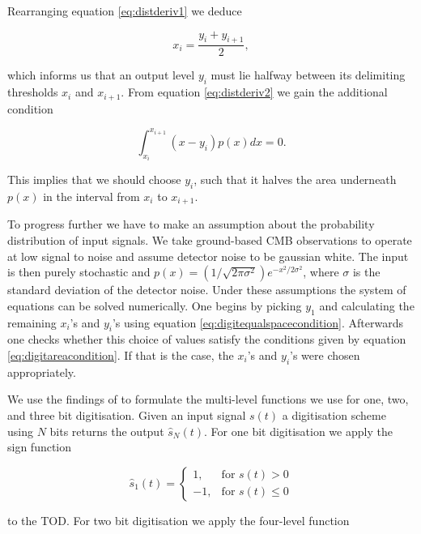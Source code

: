 \documentclass[apj]{emulateapj}
\begin{document}
Rearranging equation \ref{eq:distderiv1} we deduce

\begin{equation} \label{eq:digitequalspacecondition}
x_i = \frac{y_i+y_{i+1}}{2},
\end{equation}

which informs us that an output level $y_i$ must lie halfway between its delimiting thresholds $x_i$ and $x_{i+1}$. From equation \ref{eq:distderiv2} we gain the additional condition

\begin{equation} \label{eq:digitareacondition}
\int_{x_i}^{x_{i+1}} \left( x-y_i \right) p(x) dx = 0.
\end{equation}

This implies that we should choose $y_i$, such that it halves the area underneath $p(x)$ in the interval from $x_i$ to $x_{i+1}$.

To progress further we have to make an assumption about the probability distribution of input signals. We take ground-based CMB observations to operate at low signal to noise and assume detector noise to be gaussian white. The input is then purely stochastic and  $p(x) = (1/\sqrt{2\pi\sigma^2}) e^{-x^2/2\sigma^2}$, where $\sigma$ is the standard deviation of the detector noise. Under these assumptions the system of equations can be solved numerically. One begins by picking $y_1$ and calculating the remaining $x_i$'s and $y_i$'s using equation \ref{eq:digitequalspacecondition}. Afterwards one checks whether this choice of values satisfy the conditions given by equation \ref{eq:digitareacondition}. If that is the case, the $x_i$'s and $y_i$'s were chosen appropriately.

We use the findings of \cite{max1960} to formulate the multi-level functions we use for one, two, and three bit digitisation. Given an input signal $s(t)$ a digitisation scheme using $N$ bits returns the output $\hat{s}_N(t)$. For one bit digitisation we apply the sign function

\begin{equation} \label{eq:1bit}
\hat{s}_1(t) = \left\{ \begin{array}{lr}
1, & \text{for } s(t) > 0\\
-1, & \text{for } s(t) \leq 0
\end{array} \right. \end{equation}

to the TOD. For two bit digitisation we apply the four-level function
\end{document}
